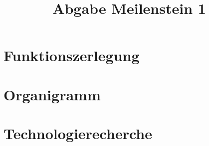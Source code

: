 \documentclass{scrartcl}                %
\begin{document}
\title{Abgabe Meilenstein 1}
\maketitle

\tableofcontents
\newpage


\newpage

\section{Funktionszerlegung}

\newpage
\section{Organigramm}

\newpage


\newpage

\section{Technologierecherche}

\newpage


\newpage
\end{document}

